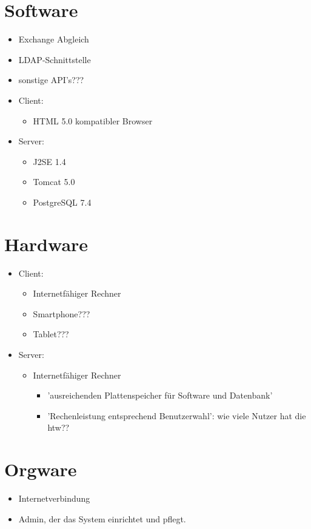 \documentclass[a4paper,report,headsepline]{scrreprt}
\begin{document}
\section{Software}\label{software}
\begin{itemize}
\item Exchange Abgleich
\item LDAP-Schnittstelle
\item sonstige API's???
\item Client: 
\begin{itemize} 
\item HTML 5.0 kompatibler Browser
\end{itemize}
\item Server:
\begin{itemize} 
\item J2SE 1.4
\item Tomcat 5.0
\item PostgreSQL 7.4
\end{itemize}

\end{itemize}

\section{Hardware}\label{hardware}
\begin{itemize}
\item Client: 
\begin{itemize} 
\item Internetfähiger Rechner
\item Smartphone???
\item Tablet???
\end{itemize}
\item Server:
\begin{itemize} 
\item Internetfähiger Rechner
\begin{itemize}
\item 'ausreichenden Plattenspeicher für Software und Datenbank'
\item 'Rechenleistung entsprechend Benutzerwahl': wie viele Nutzer hat die htw??

\end{itemize}
\end{itemize}
\end{itemize}


\section{Orgware}\label{orgware}
\begin{itemize}
\item Internetverbindung
\item Admin, der das System einrichtet und pflegt.
\end{itemize}
\end{document}
